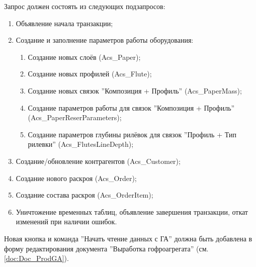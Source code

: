 Запрос должен состоять из следующих подзапросов:
\begin{enumerate}
    \item 	Объявление начала транзакции;
    \item 	Создание и заполнение параметров работы оборудования:
    \begin{enumerate}
    \item 	Создание новых слоёв (Acs\_Paper);
    \item 	Создание новых профилей (Acs\_Flute);
    \item 	Создание новых связок ''Композиция + Профиль'' (Acs\_PaperMass);
    \item 	Создание параметров работы для связок ''Композиция + Профиль'' (Acs\_PaperReserParameters);
    \item 	Создание параметров глубины рилёвок для связок ''Профиль + Тип рилевки'' (Acs\_FlutesLineDepth);
    \end{enumerate}
    \item 	Создание/обновление контрагентов (Acs\_Customer);
    \item 	Создание нового раскроя (Acs\_Order);
    \item 	Создание состава раскроя (Acs\_OrderItem);
    \item 	Уничтожение временных таблиц, объявление завершения транзакции, откат изменений при наличии ошибок.
\end{enumerate}




\bigskip

\label{sec:startreading}

Новая кнопка и команда ''Начать чтение данных с ГА''  должна быть добавлена в форму редактирования документа ''Выработка гофроагрегата'' (см. \ref{doc:Doc_ProdGA}).

